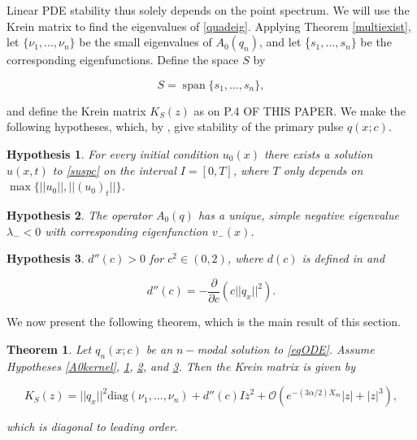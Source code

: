 \documentclass[12pt]{article}
\DeclareMathOperator{\spn}{span}
\newtheorem{theorem}{Theorem}
\newtheorem{hypothesis}{Hypothesis}
\begin{document}
Linear PDE stability thus solely depends on the point spectrum. We will use the Krein matrix to find the eigenvalues of \eqref{quadeig}. Applying Theorem \ref{multiexist}, let $\{\nu_1, \dots, \nu_n\}$ be the small eigenvalues of $A_0(q_n)$, and let \{$s_1, \dots, s_n\}$ be the corresponding eigenfunctions. Define the space $S$ by

\begin{equation}\label{defS}
S = \spn\{s_1, \dots, s_n \},
\end{equation}

and define the Krein matrix $K_S(z)$ as on P.4 OF THIS PAPER. We make the following hypotheses, which, by \cite[Theorems 5.5 and 3]{Grillakis1987}, give stability of the primary pulse $q(x; c)$.

\begin{hypothesis}\label{PDEexisthyp}
For every initial condition $u_0(x)$ there exists a solution $u(x, t)$ to \eqref{suspc} on the interval $I = [0, T]$, where $T$ only depends on $\max{ \{ ||u_0||, ||(u_0)_t|| \} }$.
\end{hypothesis}

\begin{hypothesis}\label{A0neg}
The operator $A_0(q)$ has a unique, simple negative eigenvalue $\lambda_- < 0$ with corresponding eigenfunction $v_-(x)$.
\end{hypothesis}

\begin{hypothesis}\label{dccpos}
$d''(c) > 0$ for $c^2 \in (0, 2)$, where $d(c)$ is defined in \cite[Equation (2.16)]{Grillakis1987} and 

\begin{equation}\label{dcc}
d''(c) = -\frac{\partial}{\partial c} \left( c ||q_x||^2 \right).
\end{equation}
\end{hypothesis}

We now present the following theorem, which is the main result of this section.

\begin{theorem}\label{Kreindiag}
Let $q_n(x; c)$ be an $n-$modal solution to \eqref{eqODE}. Assume Hypotheses \ref{A0kernel}, \ref{PDEexisthyp}, \ref{A0neg}, and \ref{dccpos}. Then the Krein matrix is given by

\begin{equation}\label{Kreinapprox}
K_S(z) = ||q_x||^2 \text{diag} (\nu_1, \dots, \nu_n)
 + d''(c) I \overline{z}^2 + \mathcal{O}(e^{-(3 \alpha/2) X_m}|z| + |z|^3),
\end{equation}

which is diagonal to leading order.

\end{theorem}
\end{document}

